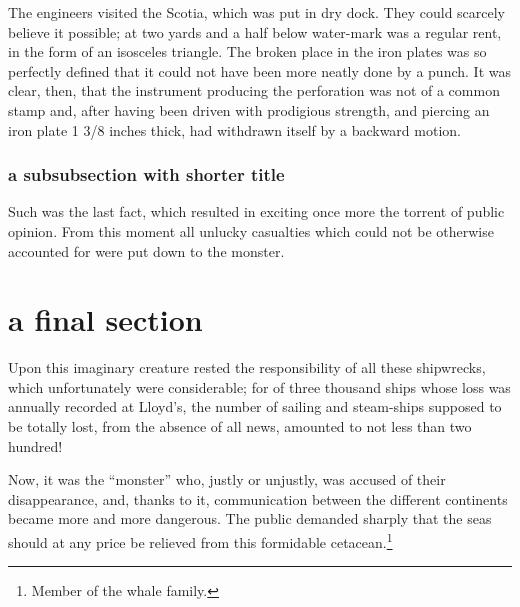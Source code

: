 The engineers visited the Scotia, which was put in dry dock.
They could scarcely believe it possible; at two yards and a half below
water-mark was a regular rent, in the form of an isosceles triangle.
The broken place in the iron plates was so perfectly defined
that it could not have been more neatly done by a punch.
It was clear, then, that the instrument producing the perforation
was not of a common stamp and, after having been driven with
prodigious strength, and piercing an iron plate 1 3/8 inches thick,
had withdrawn itself by a backward motion.

\subsubsection{a subsubsection with shorter title}

Such was the last fact, which resulted in exciting once more the torrent
of public opinion.  From this moment all unlucky casualties which could
not be otherwise accounted for were put down to the monster.

\section{a final section}

Upon this imaginary creature rested the responsibility of all
these shipwrecks, which unfortunately were considerable;
for of three thousand ships whose loss was annually recorded
at Lloyd's, the number of sailing and steam-ships supposed
to be totally lost, from the absence of all news, amounted to
not less than two hundred!

Now, it was the ``monster'' who, justly or unjustly, was accused
of their disappearance, and, thanks to it, communication between
the different continents became more and more dangerous.
The public demanded sharply that the seas should at any price be
relieved from this formidable cetacean.\footnote{Member of the whale family.}

